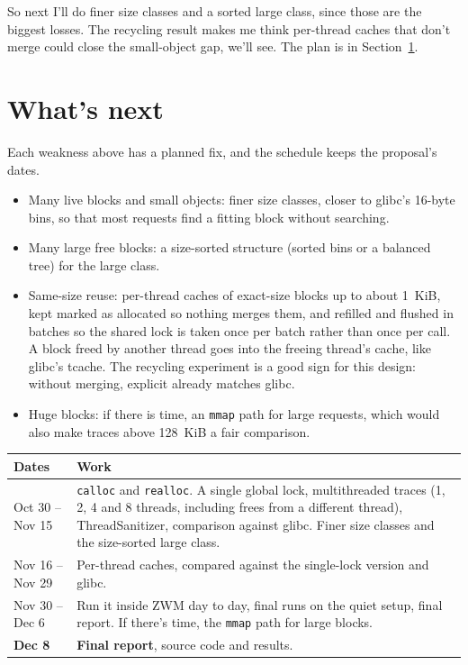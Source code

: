 \documentclass[11pt,letterpaper]{article}
\begin{document}
So next I'll do finer size classes and a sorted large class, since those are the biggest losses. The recycling result makes me think per-thread caches that don't merge could close the small-object gap, we'll see. The plan is in Section~\ref{sec:next}.

\section{What's next}
\label{sec:next}

Each weakness above has a planned fix, and the schedule keeps the proposal's dates.

\begin{itemize}
  \item Many live blocks and small objects: finer size classes, closer to glibc's 16-byte bins, so that most requests find a fitting block without searching.
  \item Many large free blocks: a size-sorted structure (sorted bins or a balanced tree) for the large class.
  \item Same-size reuse: per-thread caches of exact-size blocks up to about 1~KiB, kept marked as allocated so nothing merges them, and refilled and flushed in batches so the shared lock is taken once per batch rather than once per call. A block freed by another thread goes into the freeing thread's cache, like glibc's tcache. The recycling experiment is a good sign for this design: without merging, explicit already matches glibc.
  \item Huge blocks: if there is time, an \texttt{mmap} path for large requests, which would also make traces above 128~KiB a fair comparison.
\end{itemize}

\begin{center}
\small
\begin{tabularx}{\textwidth}{@{}p{1.25in}X@{}}
\toprule
\textbf{Dates} & \textbf{Work} \\
\midrule
Oct 30 -- Nov 15 & \texttt{calloc} and \texttt{realloc}. A single global lock, multithreaded traces (1, 2, 4 and 8 threads, including frees from a different thread), ThreadSanitizer, comparison against glibc. Finer size classes and the size-sorted large class. \\
\addlinespace
Nov 16 -- Nov 29 & Per-thread caches, compared against the single-lock version and glibc. \\
\addlinespace
Nov 30 -- Dec 6 & Run it inside ZWM day to day, final runs on the quiet setup, final report. If there's time, the \texttt{mmap} path for large blocks. \\
\addlinespace
\textbf{Dec 8} & \textbf{Final report}, source code and results. \\
\bottomrule
\end{tabularx}
\end{center}
\end{document}
